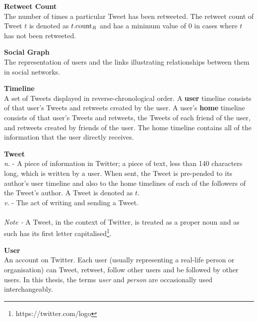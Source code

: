 {\bf Retweet Count}\\
The number of times a particular Tweet has been retweeted. The retweet count of Tweet $t$ is denoted as $t.\textrm{count}_R$ and has a minimum value of $0$ in cases where $t$ has not been retweeted.


{\bf Social Graph}\\
The representation of users and the links illustrating relationships between them in social networks.

{\bf Timeline}\\
A set of Tweets displayed in reverse-chronological order. A \textbf{user} timeline consists of that user's Tweets and retweets created by the user. A user's \textbf{home} timeline consists of that user's Tweets and retweets, the Tweets of each friend of the user, and retweets created by friends of the user. The home timeline contains all of the information that the user directly receives. 

{\bf Tweet}\\
\textit{n.} - A piece of information in Twitter; a piece of text, less than 140 characters long, which is written by a user. When sent, the Tweet is pre-pended to its author's user timeline and also to the home timelines of each of the followers of the Tweet's author. A Tweet is denoted as $t$.\\
\textit{v.} - The act of writing and sending a Tweet.\\ \\
\textit{Note -} A Tweet, in the context of Twitter, is treated as a proper noun and as such has its first letter capitalised\footnote{https://twitter.com/logo}.

{\bf User}\\
An account on Twitter. Each user (usually representing a real-life person or organisation) can Tweet, retweet, follow other users and be followed by other users. In this thesis, the terms \textit{user} and \textit{person} are occasionally used interchangeably.
